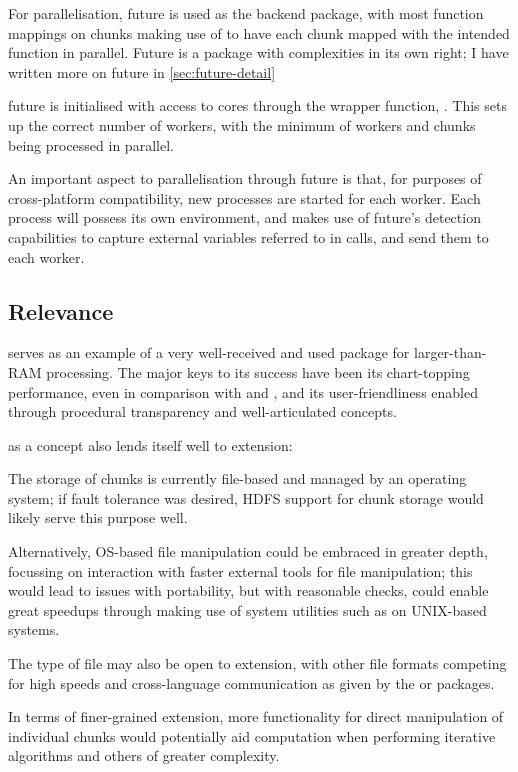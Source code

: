 For parallelisation, future is used as the backend package, with most function mappings on chunks making use of  to have each chunk mapped with the intended function in parallel.
Future is a package with complexities in its own right; I have written more on future in \cref{sec:future-detail}

future is initialised with access to cores through the wrapper function, \cite{zj19:_key}.
This sets up the correct number of workers, with the minimum of workers and chunks being processed in parallel.

An important aspect to parallelisation through future is that, for purposes of cross-platform compatibility, new \R{} processes are started for each worker\cite{zj19:_using}.
Each process will possess its own environment, and  makes use of future's detection capabilities to capture external variables referred to in calls, and send them to each worker.

\subsection{Relevance}\label{sec:relevance}

 serves as an example of a very well-received and used package
for larger-than-RAM processing.
The major keys to its success have been its chart-topping performance, even in comparison with  and , and its user-friendliness enabled through procedural transparency and well-articulated concepts.

 as a concept also lends itself well to extension:

The storage of chunks is currently file-based and managed by an operating system; if fault tolerance was desired, HDFS support for chunk storage would likely serve this purpose well.

Alternatively, OS-based file manipulation could be embraced in greater depth, focussing on interaction with faster external tools for file manipulation; this would lead to issues with portability, but with reasonable checks, could enable great speedups through making use of system utilities such as  on UNIX-based systems.

The type of file may also be open to extension, with other file formats competing for high speeds and cross-language communication as given by the \cite{wes16} or  packages\cite{arrow23}.

In terms of finer-grained extension, more functionality for direct manipulation of individual chunks would potentially aid computation when performing iterative algorithms and others of greater complexity.
